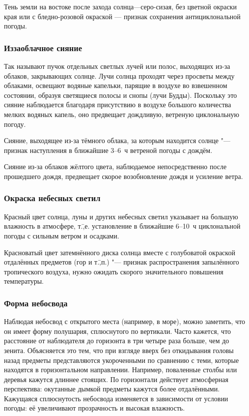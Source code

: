  Тень земли на востоке после захода солнца—серо-сизая, без цветной
окраски края или с бледно-розовой окраской — признак сохранения
антициклональной погоды.

\subsubsection{Иззаоблачное сияние}

Так называют пучок отдельных светлых лучей или полос, выходящих из-за
облаков, закрывающих солнце. Лучи солнца проходят через просветы между
облаками, освещают водяные капельки, парящие в воздухе во взвешенном
состоянии, образуя светящиеся полосы и снопы (лучи Будды). Поскольку
это сияние наблюдается благодаря присутствию в воздухе большого
количества мелких водяных капель, оно предвещает дождливую, ветреную
циклональную погоду.

 Сияние, выходящее из-за тёмного облака, за которым находится
солнце "--- признак наступления в ближайшие 3--6~ч ветреной погоды с
дождём.

 Сияние из-за облаков жёлтого цвета, наблюдаемое
непосредственно после прошедшего дождя, предвещает скорое
возобновление дождя и усиление ветра.

\subsubsection{Окраска небесных светил}

 Красный цвет солнца, луны и других небесных светил указывает
на большую влажность в атмосфере, т.\=,е. установление в ближайшие
6--10~ч циклональной погоды с сильным ветром и осадками.

 Красноватый цвет затемнённого диска солнца вместе с
голубоватой окраской отдалённых предметов (гор и т.\=,п.) "--- признак
распространения запылённого тропического воздуха, нужно ожидать
скорого значительного повышения температуры.

\subsubsection{Форма небосвода}

Наблюдая небосвод с открытого места (например, в море), можно
заметить, что он имеет форму полушария, сплюснутого по
вертикали. Часто кажется, что расстояние от наблюдателя до горизонта в
три четыре раза больше, чем до зенита. Объясняется это тем, что при
взгляде вверх без откидывания головы назад предметы представляются
укороченными по сравнению с теми, которые находятся в горизонтальном
направлении.  Например, поваленные столбы или деревья кажутся длиннее
стоящих. По горизонтали действует атмосферная перспектива: окутанные
дымкой предметы кажутся более отдалёнными. Кажущаяся сплюснутость
небосвода изменяется в зависимости от условии погоды: её увеличивают
прозрачность и высокая влажность.

